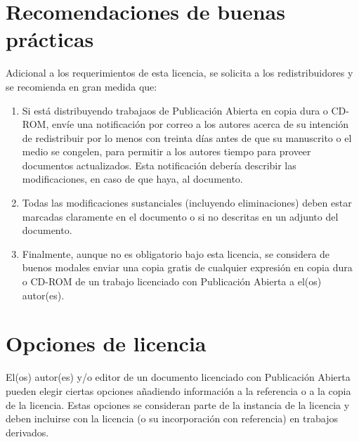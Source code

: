 \section{Recomendaciones de buenas prácticas}

Adicional a los requerimientos de esta licencia, se solicita a los
redistribuidores y se recomienda en gran medida que:

\begin{enumerate}
\item Si está distribuyendo trabajaos de Publicación Abierta en copia
  dura o CD-ROM, envíe una notificación por correo a los autores
  acerca de su intención de redistribuir por lo menos con treinta días
  antes de que su manuscrito o el medio se congelen, para permitir a
  los autores tiempo para proveer documentos actualizados.  Esta
  notificación debería describir las modificaciones, en caso de que
  haya, al documento.
\item Todas las modificaciones sustanciales (incluyendo eliminaciones)
  deben estar marcadas claramente en el documento o si no descritas en
  un adjunto del documento.
\item Finalmente, aunque no es obligatorio bajo esta licencia, se
  considera de buenos modales enviar una copia gratis de cualquier
  expresión en copia dura o CD-ROM de un trabajo licenciado con
  Publicación Abierta a el(os) autor(es).
\end{enumerate}

\section{Opciones de licencia}
\label{sec:opl:options}

El(os) autor(es) y/o editor de un documento licenciado con Publicación
Abierta pueden elegir ciertas opciones añadiendo información a la
referencia o a la copia de la licencia.  Estas opciones se consideran
parte de la instancia de la licencia y deben incluirse con la
licencia (o su incorporación con referencia) en trabajos derivados.

